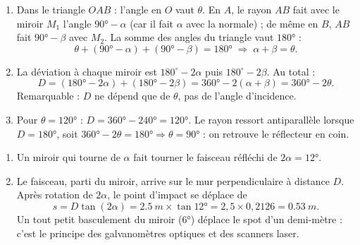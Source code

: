 \documentclass[11pt,a4paper]{article}
\begin{document}
\begin{corrige}
\begin{enumerate}[label=\alph*)]
  \item Dans le triangle $OAB$ : l'angle en $O$ vaut $\theta$. En $A$, le rayon $AB$ fait avec le
        miroir $M_1$ l'angle $\ang{90}-\alpha$ (car il fait $\alpha$ avec la normale) ; de même en $B$,
        $AB$ fait $\ang{90}-\beta$ avec $M_2$. La somme des angles du triangle vaut $\ang{180}$ :
        \[ \theta+(\ang{90}-\alpha)+(\ang{90}-\beta)=\ang{180}\;\Longrightarrow\;\boxed{\alpha+\beta=\theta}. \]
  \item La déviation à chaque miroir est $180^\circ-2\alpha$ puis $180^\circ-2\beta$. Au total :
        \[ D=(\ang{180}-2\alpha)+(\ang{180}-2\beta)=\ang{360}-2(\alpha+\beta)=\boxed{\ang{360}-2\theta}. \]
        Remarquable : $D$ ne dépend que de $\theta$, pas de l'angle d'incidence.
  \item Pour $\theta=\ang{120}$ : $D=\ang{360}-\ang{240}=\ang{120}$. Le rayon ressort antiparallèle
        lorsque $D=\ang{180}$, soit $\ang{360}-2\theta=\ang{180}\Rightarrow\theta=\ang{90}$ : on
        retrouve le réflecteur en coin.
\end{enumerate}
\end{corrige}

\begin{corrige}
\begin{enumerate}[label=\alph*)]
  \item Un miroir qui tourne de $\alpha$ fait tourner le faisceau réfléchi de $2\alpha=\ang{12}$.
  \item Le faisceau, parti du miroir, arrive sur le mur perpendiculaire à distance $D$. Après rotation
        de $2\alpha$, le point d'impact se déplace de
        \[ s=D\tan(2\alpha)=\qty{2.5}{m}\times\tan\ang{12}=2{,}5\times0{,}2126=\qty{0.53}{m}. \]
        Un tout petit basculement du miroir ($\ang{6}$) déplace le spot d'un demi-mètre : c'est le
        principe des galvanomètres optiques et des scanners laser.
\end{enumerate}
\end{corrige}
\end{document}
